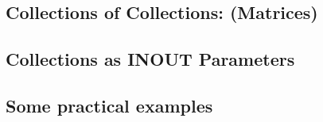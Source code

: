 \subsection{Collections of Collections: (Matrices)}
\label{subsec:col_depth}

\subsection{Collections as INOUT Parameters}
\label{subsec:col_inout}

\subsection{Some practical examples}
\label{subsec:col_examples}
